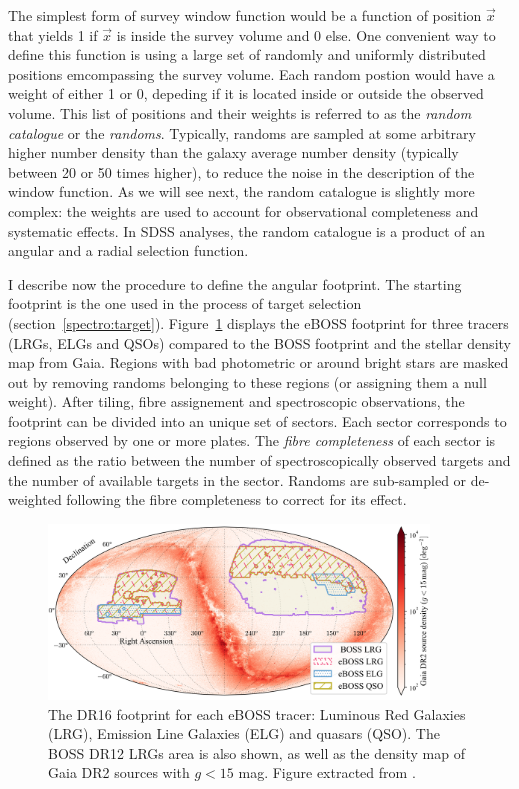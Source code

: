 The simplest form of survey window function would be a 
function of position $\vec{x}$ that yields 1 if $\vec{x}$ is inside the survey volume 
and 0 else. 
One convenient way to define this function is using a large set of randomly 
and uniformly distributed positions emcompassing the survey volume. 
Each random postion would have a weight of either 1 or 0, 
depeding if it is located inside or outside the observed volume. 
This list of positions and their weights is referred to as the \emph{random catalogue} or the \emph{randoms}.  
Typically, randoms are sampled at some arbitrary higher number density than the 
galaxy average number density (typically between 20 or 50 times higher), 
to reduce the noise in the description of the window function. 
As we will see next, the random catalogue is slightly more complex: 
the weights are used to account for observational completeness and systematic effects. 
In SDSS analyses, the random catalogue is a product of an angular and a radial selection function.

I describe now the procedure to define the angular footprint. 
The starting footprint is the one used in the process of target selection 
(section~\ref{spectro:target}).
Figure~\ref{fig:eboss_footprint} displays the eBOSS footprint for three tracers 
(LRGs, ELGs and QSOs) compared to the BOSS footprint and the stellar density map from Gaia. 
Regions with bad photometric or around 
bright stars are masked out by removing randoms belonging to these regions
(or assigning them a null weight). 
After tiling, fibre assignement and spectroscopic observations, the footprint 
can be divided into an unique set of sectors. Each sector corresponds to regions
observed by one or more plates. The \emph{fibre completeness} of each sector is 
defined as the ratio between the number of spectroscopically observed targets and 
the number of available targets in the sector. 
Randoms are sub-sampled or de-weighted following the fibre completeness to correct for its effect. 

\begin{figure}
    \centering 
    \includegraphics[width=0.9\textwidth]{fig/galaxies/eboss_footprint.png}
    \caption{ The DR16 footprint for each eBOSS tracer: Luminous Red Galaxies (LRG), 
    Emission Line Galaxies (ELG) and quasars (QSO). The BOSS DR12 LRGs area is also shown, 
    as well as the density map of Gaia DR2 sources with $g < 15$ mag.
    Figure extracted from \cite{zhaoCompletedSDSSIVExtended2021}.} 
    \label{fig:eboss_footprint}
\end{figure}

